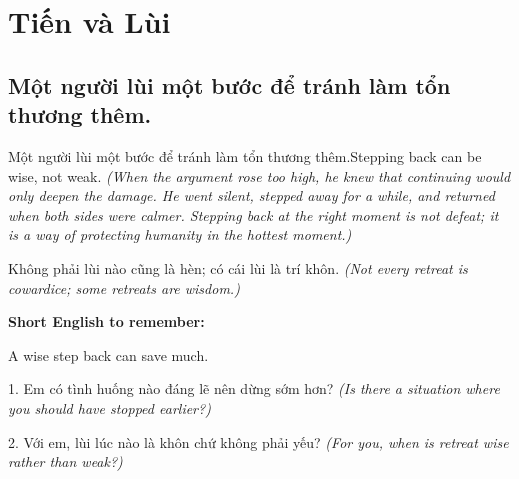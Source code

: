 \chapter{Tiến và Lùi}

\section{Một người lùi một bước để tránh làm tổn thương thêm.}
\begin{truyen}{Một người lùi một bước để tránh làm tổn thương thêm.}{Stepping back can be wise, not weak.}
\textit{(When the argument rose too high, he knew that continuing would only deepen the damage. He went silent, stepped away for a while, and returned when both sides were calmer. Stepping back at the right moment is not defeat; it is a way of protecting humanity in the hottest moment.)}
\end{truyen}
\begin{baihoc}
Không phải lùi nào cũng là hèn; có cái lùi là trí khôn.
\textit{(Not every retreat is cowardice; some retreats are wisdom.)}
\end{baihoc}
\begin{ghinhoanh}
\textbf{Short English to remember:}

A wise step back can save much.
\end{ghinhoanh}
\begin{tuhocnhanh}
1. Em có tình huống nào đáng lẽ nên dừng sớm hơn? \textit{(Is there a situation where you should have stopped earlier?)}

2. Với em, lùi lúc nào là khôn chứ không phải yếu? \textit{(For you, when is retreat wise rather than weak?)}
\end{tuhocnhanh}
\ngancach

